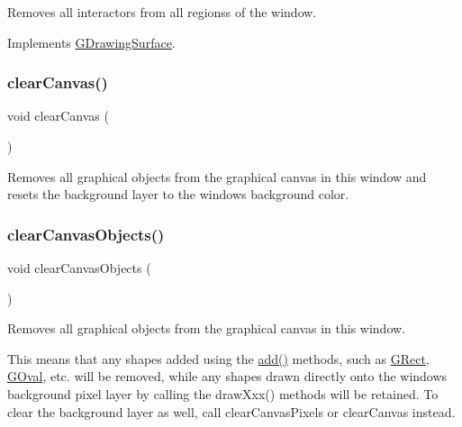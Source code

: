 Removes all interactors from all regionss of the window. 



Implements \mbox{\hyperlink{classGDrawingSurface_a5eeb94d22b8366d1b68d0614384802fe}{G\+Drawing\+Surface}}.

\mbox{\label{classGWindow_a8c64b6dc10f111538780ddca425a1693}} 
\subsubsection{\texorpdfstring{clear\+Canvas()}{clearCanvas()}}
{\footnotesize\ttfamily void clear\+Canvas (\begin{DoxyParamCaption}{ }\end{DoxyParamCaption})\hspace{0.3cm}{\ttfamily [virtual]}}



Removes all graphical objects from the graphical canvas in this window and resets the background layer to the window\textquotesingle{}s background color. 

\mbox{\label{classGWindow_a7d6e3e87568ed9962d29a0c9337c4b87}} 
\subsubsection{\texorpdfstring{clear\+Canvas\+Objects()}{clearCanvasObjects()}}
{\footnotesize\ttfamily void clear\+Canvas\+Objects (\begin{DoxyParamCaption}{ }\end{DoxyParamCaption})\hspace{0.3cm}{\ttfamily [virtual]}}



Removes all graphical objects from the graphical canvas in this window. 

This means that any shapes added using the \mbox{\hyperlink{classGWindow_a6f99b7c841256dbdc5acaafbbca4e685}{add()}} methods, such as \mbox{\hyperlink{classGRect}{G\+Rect}}, \mbox{\hyperlink{classGOval}{G\+Oval}}, etc. will be removed, while any shapes drawn directly onto the window\textquotesingle{}s background pixel layer by calling the draw\+Xxx() methods will be retained. To clear the background layer as well, call clear\+Canvas\+Pixels or clear\+Canvas instead. \mbox{\label{classGWindow_a0c30950304fa997055183be1d212a262}} 
